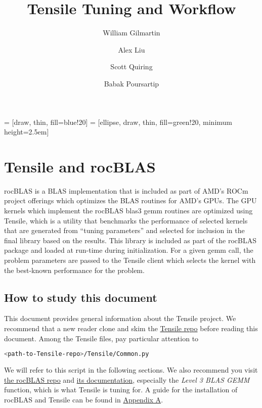 \documentclass[]{article}
\title{Tensile Tuning and Workflow}
\author{William Gilmartin \and Alex Liu \and Scott Quiring \and Babak Poursartip}
\begin{document}
\maketitle

\newpage

\tableofcontents



 = [draw, thin, fill=blue!20]
 = [ellipse, draw, thin, fill=green!20, minimum height=2.5em]

\newpage

\section{Tensile and rocBLAS}


rocBLAS is a BLAS implementation that is included as part of AMD's ROCm project offerings which optimizes the BLAS routines for AMD's GPUs. The GPU kernels which implement the rocBLAS blas3 gemm routines are optimized using Tensile, which is a utility that benchmarks the performance of selected kernels that are generated from ``tuning parameters'' and selected for inclusion in the final library based on the results. This library is included as part of the rocBLAS package and loaded at run-time during initialization. For a given gemm call, the problem parameters are passed to the Tensile client which selects the kernel with the best-known performance for the problem.


\subsection{How to study this document}
This document provides general information about the Tensile project. We recommend that a new reader clone and skim the \href{https://github.com/ROCmSoftwarePlatform/Tensile}{Tensile repo} before reading this document. Among the Tensile files, pay particular attention to

\begin{lstlisting}[language=bash,breaklines=true]
<path-to-Tensile-repo>/Tensile/Common.py
\end{lstlisting}

\noindent We will refer to this script in the following sections. We also recommend you visit \href{https://github.com/ROCmSoftwarePlatform/rocBLAS}{the rocBLAS repo} and \href{https://rocblas.readthedocs.io/en/rocm-4.5.0/}{its documentation}, especially the \textit{Level 3 BLAS GEMM} function, which is what Tensile is tuning for. A guide for the installation of rocBLAS and Tensile can be found in \hyperref[sec:appendixA]{Appendix A}.
\end{document}
